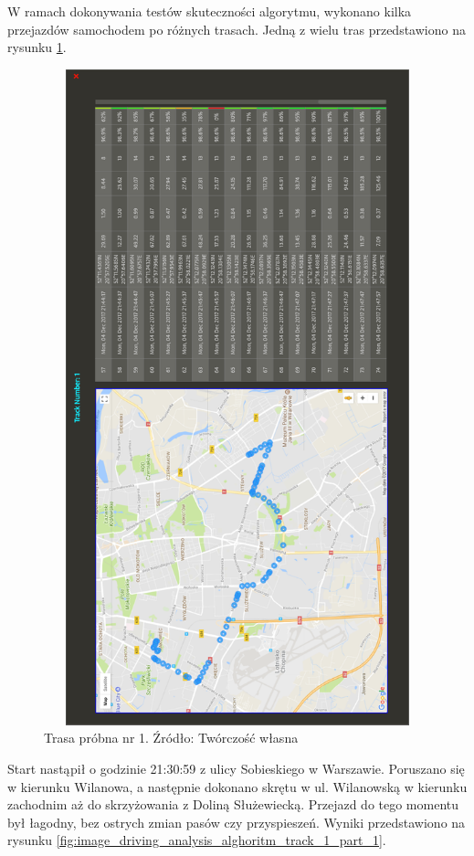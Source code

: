 W ramach dokonywania testów skuteczności algorytmu, wykonano kilka przejazdów samochodem po różnych trasach. Jedną z wielu tras przedstawiono na rysunku \ref{fig:image_driving_analysis_alghoritm_track_1}.

\begin{figure}[H]
	\centering
	\includegraphics[height=19cm, width=13cm]{img/driving_analysis/test_track_1.png}
	\caption{Trasa próbna nr 1. Źródło: Twórczość własna}
	\label{fig:image_driving_analysis_alghoritm_track_1}
\end{figure}

Start nastąpił o godzinie 21:30:59 z ulicy Sobieskiego w Warszawie. Poruszano się w kierunku Wilanowa, a następnie dokonano skrętu w ul. Wilanowską w kierunku zachodnim aż do skrzyżowania z Doliną Służewiecką. Przejazd do tego momentu był łagodny, bez ostrych zmian pasów czy przyspieszeń. Wyniki przedstawiono na rysunku \ref{fig:image_driving_analysis_alghoritm_track_1_part_1}.

